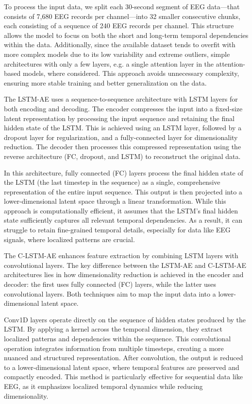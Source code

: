\documentclass[conference]{IEEEtran}
\begin{document}
To process the input data, we split each 30-second segment of EEG
data---that consists of 7,680 EEG records per channel---into 32
smaller consecutive chunks, each consisting of a sequence of 240 EEG
records per channel. This structure allows the model to focus on both
the short and long-term temporal dependencies within the
data. Additionally, since the available dataset tends to overfit with
more complex models due to its low variability and extreme outliers,
simple architectures with only a few layers, e.g. a single attention
layer in the attention-based models, where considered. This approach
avoids unnecessary complexity, ensuring more stable training and
better generalization on the data.

The LSTM-AE uses a sequence-to-sequence architecture with LSTM layers for both encoding and decoding. The encoder compresses the input into a fixed-size latent representation by processing the input sequence and retaining the final hidden state of the LSTM. This is achieved using an LSTM layer, followed by a dropout layer for regularization, and a fully-connected layer for dimensionality reduction. The decoder then processes this compressed representation using the reverse architecture (FC, dropout, and LSTM) to reconstruct the original data.

In this architecture, fully connected (FC) layers process the final hidden state of the LSTM (the last timestep in the sequence) as a single, comprehensive representation of the entire input sequence. This output is then projected into a lower-dimensional latent space through a linear transformation. While this approach is computationally efficient, it assumes that the LSTM’s final hidden state sufficiently captures all relevant temporal dependencies. As a result, it can struggle to retain fine-grained temporal details, especially for data like EEG signals, where localized patterns are crucial.

The C-LSTM-AE enhances feature extraction by combining LSTM layers with convolutional layers. The key difference between the LSTM-AE and C-LSTM-AE architectures lies in how dimensionality reduction is achieved in the encoder and decoder: the first uses fully connected (FC) layers, while the latter uses convolutional layers. Both techniques aim to map the input data into a lower-dimensional latent space.

Conv1D layers operate directly on the sequence of hidden states produced by the LSTM. By applying a kernel across the temporal dimension, they extract localized patterns and dependencies within the sequence. This convolutional operation integrates information from multiple timesteps, creating a more nuanced and structured representation. After convolution, the output is reduced to a lower-dimensional latent space, where temporal features are preserved and compactly encoded. This method is particularly effective for sequential data like EEG, as it emphasizes localized temporal dynamics while reducing dimensionality.
\end{document}
